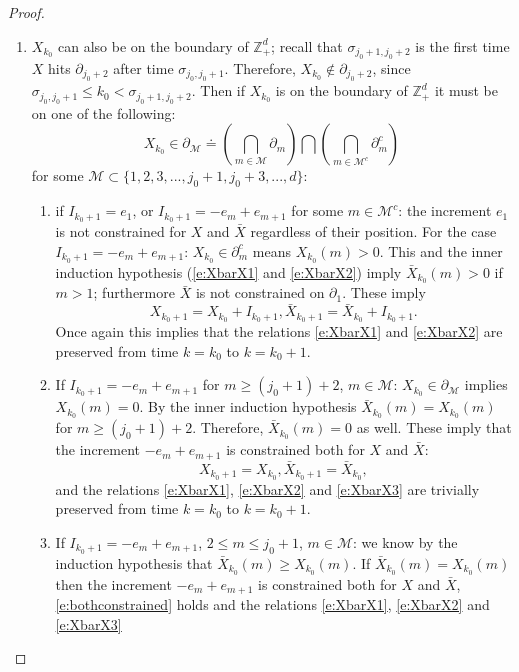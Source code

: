 \documentclass[11pt,a4paper]{article}
\begin{document}
\begin{proof}
\begin{enumerate}
\item $X_{k_0}$ can also be on the boundary of ${\mathbb Z}_+^d$; recall that $\sigma_{j_0 + 1,j_0 + 2}$ is the first
time $X$ hits $\partial_{j_0 + 2}$ after time $\sigma_{j_0, j_0+1}$. Therefore, $X_{k_0} \notin \partial_{j_0 + 2}$, since
$\sigma_{j_0, j_0 +1} \le k_0 < \sigma_{j_0 + 1, j_0 + 2}$.
Then if $X_{k_0}$ is on the boundary of ${\mathbb Z}_+^d$ it must be on one of the following:
\[
X_{k_0} \in  
\partial_{\mathcal M} \doteq 
\left(\bigcap_{m \in {\mathcal M}} \partial_m \right) \bigcap\left( \bigcap_{m \in {\mathcal M}^c} \partial_m^c\right) 
\]
for some
${\mathcal M} \subset\{1,2,3,...,j_0 + 1, j_0+3,...,d\}$: 
\begin{enumerate}
\item 
if $I_{k_0 + 1} = e_1$, or $I_{k_0 + 1} = -e_m + e_{m+1}$ for some $m \in {\mathcal M}^c$: 
the increment $e_1$ is not constrained for $X$ and $\bar{X}$ regardless of their position. For  the case
$I_{k_0 +1} = -e_m + e_{m+1}$:  $X_{k_0} \in \partial_m^c$ means $X_{k_0}(m) > 0$. This 
and the inner induction hypothesis (\eqref{e:XbarX1} and \eqref{e:XbarX2}) imply $\bar{X}_{k_0}(m) > 0$ if $m > 1$; furthermore
$\bar{X}$ is not constrained on $\partial_1$. These imply
\[
X_{k_0+1} = X_{k_0} + I_{k_0+1}, \bar{X}_{k_0+1} = \bar{X}_{k_0} + I_{k_0+1}.
\]
Once again this implies that the relations \eqref{e:XbarX1} and \eqref{e:XbarX2} are preserved
from time $k=k_0$ to $k= k_0 + 1.$ 
\item If $I_{k_0 + 1} = -e_m + e_{m+1}$ for $m \ge  (j_0 +1)+2$, $m \in {\mathcal M}$: 
$X_{k_0} \in \partial_{\mathcal M}$ implies $X_{k_0}(m) = 0.$
By the inner induction hypothesis $\bar{X}_{k_0}(m) = X_{k_0}(m)$ for $m \ge (j_0 + 1) + 2$.
Therefore, $\bar{X}_{k_0}(m) = 0$ as well. These imply that the increment
$-e_m + e_{m+1}$ is constrained both for $X$ and $\bar{X}$:
\begin{equation}\label{e:bothconstrained}
X_{k_0+1} = X_{k_0},  \bar{X}_{k_0+1} = \bar{X}_{k_0},
\end{equation}
and the relations \eqref{e:XbarX1}, \eqref{e:XbarX2} and \eqref{e:XbarX3} are trivially preserved
from time $k=k_0$ to $k= k_0 + 1.$ 
\item  If $I_{k_0 + 1} = -e_m + e_{m+1}$, $2 \le m  \le j_0 + 1$, $m \in {\mathcal M}$: we know by the induction hypothesis that
$\bar{X}_{k_0}(m) \ge X_{k_0}(m)$. If $\bar{X}_{k_0}(m) = X_{k_0}(m)$ then the increment $-e_m + e_{m+1}$ is constrained both
for $X$ and $\bar{X}$, \eqref{e:bothconstrained} holds and 
the relations \eqref{e:XbarX1}, \eqref{e:XbarX2} and \eqref{e:XbarX3}

\end{enumerate}
\end{enumerate}
\end{proof}
\end{document}
